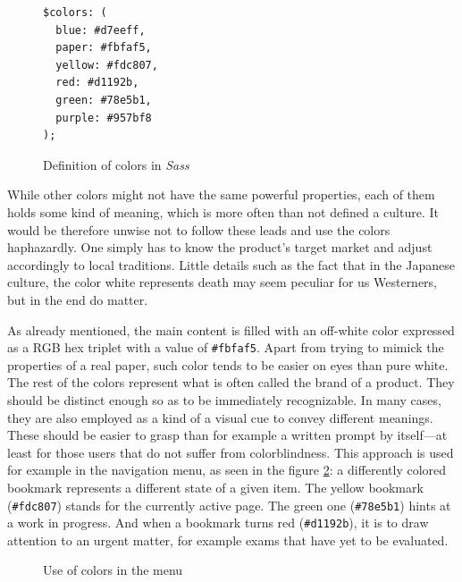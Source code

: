 \documentclass[thesis=M,english,hidelinks]{FITthesis}[2012/10/20]
\newcommand{\code}{\texttt}
\begin{document}
\begin{figure}[h]
  \begin{lstlisting}
$colors: (
  blue: #d7eeff,
  paper: #fbfaf5,
  yellow: #fdc807,
  red: #d1192b,
  green: #78e5b1,
  purple: #957bf8
);
  \end{lstlisting}
  \caption{Definition of colors in \textit{Sass}}
  \label{fig:sass_colors}
\end{figure}

While other colors might not have the same powerful properties, each of them holds some kind of meaning, which is more often than not defined a culture. It would be therefore unwise not to follow these leads and use the colors haphazardly. One simply has to know the product's target market and adjust accordingly to local traditions. Little details such as the fact that in the Japanese culture, the color white represents death may seem peculiar for us Westerners, but in the end do matter.

As already mentioned, the main content is filled with an off-white color expressed as a RGB hex triplet with a value of \code{\#fbfaf5}. Apart from trying to mimick the properties of a real paper, such color tends to be easier on eyes than pure white. The rest of the colors represent what is often called the brand of a product. They should be distinct enough so as to be immediately recognizable. In many cases, they are also employed as a kind of a visual cue to convey different meanings. These should be easier to grasp than for example a written prompt by itself---at least for those users that do not suffer from colorblindness. This approach is used for example in the navigation menu, as seen in the figure \ref{fig:menu}: a differently colored bookmark represents a different state of a given item. The yellow bookmark (\code{\#fdc807}) stands for the currently active page. The green one (\code{\#78e5b1}) hints at a work in progress. And when a bookmark turns red (\code{\#d1192b}), it is to draw attention to an urgent matter, for example exams that have yet to be evaluated.

\begin{figure}
  \setlength\fboxsep{0pt}
  \setlength\fboxrule{0.2pt}
  \caption{Use of colors in the menu}
  \label{fig:menu}
\end{figure}
\end{document}
